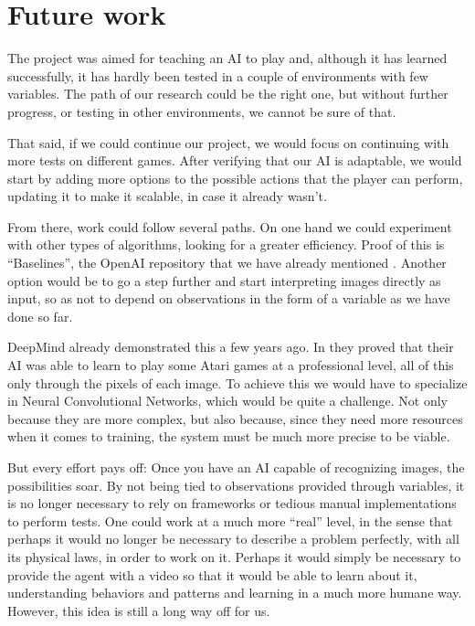 \section{Future work}

The project was aimed for teaching an AI to play and, although it has learned successfully, it has hardly been tested in a couple of environments with few variables. The path of our research could be the right one, but without further progress, or testing in other environments, we cannot be sure of that.

That said, if we could continue our project, we would focus on continuing with more tests on different games. After verifying that our AI is adaptable, we would start by adding more options to the possible actions that the player can perform, updating it to make it scalable, in case it already wasn't.

From there, work could follow several paths. On one hand we could experiment with other types of algorithms, looking for a greater efficiency. Proof of this is ``Baselines'', the OpenAI repository that we have already mentioned \citep{baselines}. Another option would be to go a step further and start interpreting images directly as input, so as not to depend on observations in the form of a variable as we have done so far.

DeepMind already demonstrated this a few years ago. In \citet{mnih2013playing} they proved that their AI was able to learn to play some Atari games at a professional level, all of this only through the pixels of each image. To achieve this we would have to specialize in Neural Convolutional Networks, which would be quite a challenge. Not only because they are more complex, but also because, since they need more resources when it comes to training, the system must be much more precise to be viable.

But every effort pays off: Once you have an AI capable of recognizing images, the possibilities soar. By not being tied to observations provided through variables, it is no longer necessary to rely on frameworks or tedious manual implementations to perform tests. One could work at a much more ``real'' level, in the sense that perhaps it would no longer be necessary to describe a problem perfectly, with all its physical laws, in order to work on it. Perhaps it would simply be necessary to provide the agent with a video so that it would be able to learn about it, understanding behaviors and patterns and learning in a much more humane way. However, this idea is still a long way off for us.

